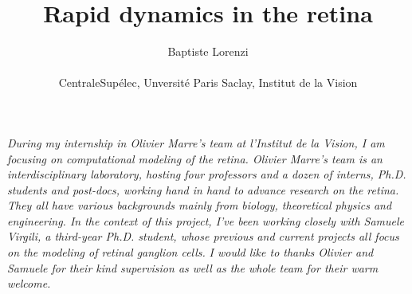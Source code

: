 \documentclass[12pt]{article}
\title{Rapid dynamics in the retina}
\author{Baptiste Lorenzi\\
    \\
    \normalsize{CentraleSupélec, Unversité Paris Saclay, Institut de la
        Vision}\\}
\date{}
\begin{document}

\baselineskip24pt


\maketitle


\textit{During my internship in Olivier Marre's team at l'Institut de la
    Vision, I am
    focusing on computational modeling of the retina. Olivier Marre's team is
    an
    interdisciplinary laboratory, hosting four professors and a dozen of
    interns,
    Ph.D. students and post-docs, working hand in hand to advance research
    on the retina. They all have various backgrounds mainly from biology,
    theoretical physics and engineering. In the context of this project, I've
    been
    working
    closely with Samuele Virgili, a third-year Ph.D. student, whose previous
    and
    current projects all focus on the modeling of retinal ganglion cells.}
\textit{I would like to thanks Olivier and Samuele for their kind supervision
    as well as the whole team for their
    warm welcome.}













% 





\clearpage
\end{document}
